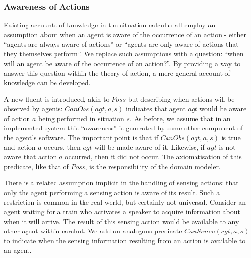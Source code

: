 \documentclass[letterpaper]{article}
\begin{document}
\subsubsection{Awareness of Actions}

Existing accounts of knowledge in the situation calculus all employ
an assumption about when an agent is aware of the occurrence of an
action - either {}``agents are always aware of actions'' or {}``agents
are only aware of actions that they themselves perform''. We replace
such assumptions with a question: {}``when will an agent be aware
of the occurrence of an action?''. By providing a way to answer this
question within the theory of action, a more general account of knowledge
can be developed.

A new fluent is introduced, akin to $Poss$ but describing when actions
will be observed by agents: $CanObs(agt,a,s)$ indicates that agent
$agt$ would be aware of action $a$ being performed in situation
$s$. As before, we assume that in an implemented system this {}``awareness''
is generated by some other component of the agent's software. The
important point is that if $CanObs(agt,a,s)$ is true and action $a$
occurs, then $agt$ will be made aware of it. Likewise, if $agt$
is not aware that action $a$ occurred, then it did not occur. The
axiomatisation of this predicate, like that of $Poss$, is the responsibility
of the domain modeler.

There is a related assumption implicit in the handling of sensing
actions: that only the agent performing a sensing action is aware
of its result. Such a restriction is common in the real world, but
certainly not universal. Consider an agent waiting for a train who
activates a speaker to acquire information about when it will arrive.
The result of this sensing action would be available to any other
agent within earshot. We add an analogous predicate $CanSense(agt,a,s)$
to indicate when the sensing information resulting from an action
is available to an agent.
\end{document}

